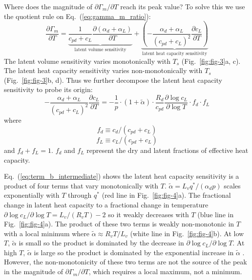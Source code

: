 \documentclass[draft]{ametsocV6.1}
\begin{document}
Where does the magnitude of $\partial\Gamma_m/\partial T$ reach its peak value? To solve this we use the quotient rule on Eq.~(\ref{eq:gamma_m_ratio}):
\begin{equation}
\frac{\partial\Gamma_m}{\partial T} = \underbrace{\frac{1}{c_{pd} + c_L}\frac{\partial(\alpha_d + \alpha_L)}{\partial T}}_{\text{latent volume sensitivity}} + \underbrace{\left(-\frac{\alpha_d + \alpha_L}{(c_{pd} + c_L)^2}\frac{\partial c_L}{\partial T}\right)}_{\text{latent heat capacity sensitivity}} \label{eq:decomposition}
\end{equation}
The latent volume sensitivity varies monotonically with $T_s$ (Fig.~\ref{fig:fig-3}a, c). The latent heat capacity sensitivity varies non-monotonically with $T_s$ (Fig.~\ref{fig:fig-3}b, d). Thus we further decompose the latent heat capacity sensitivity to probe its origin:
\begin{equation}
-\frac{\alpha_d + \alpha_L}{(c_{pd} + c_L)^2}\frac{\partial c_L}{\partial T} = -\frac{1}{p} \cdot \left(1 + \tilde{\alpha}\right) \cdot \frac{R_d}{c_{pd}}\frac{\partial\log{c_L}}{\partial \log{T}} \cdot f_d \cdot f_L \label{eq:term_b_intermediate}
\end{equation}
where
\begin{equation}
f_d \equiv c_{d}/(c_{pd} + c_L) \label{eq:f_d}
\end{equation}
\begin{equation}
f_L \equiv c_{L}/(c_{pd} + c_L) \label{eq:f_L}
\end{equation}
and $f_d + f_L = 1$. $f_d$ and $f_L$ represent the dry and latent fractions of effective heat capacity. 

Eq.~(\ref{eq:term_b_intermediate}) shows the latent heat capacity sensitivity is a product of four terms that vary monotonically with $T$. $\tilde{\alpha}=L_v q^* / (\alpha_d p)$ scales exponentially with $T$ through $q^*$ (red line in Fig.~\ref{fig:fig-4}a). The fractional change in latent heat capacity to a fractional change in temperature $\partial\log{c_L}/\partial\log{T} = L_v / (R_v T) - 2$ so it weakly decreases with $T$ (blue line in Fig.~\ref{fig:fig-4}a). The product of these two terms is weakly non-monotonic in $T$ with a local minimum where $\tilde{\alpha} \approx R_vT/L_v$ (white line in Fig.~\ref{fig:fig-4}b). At low $T$, $\tilde{\alpha}$ is small so the product is dominated by the decrease in $\partial\log{c_L}/\partial\log{T}$. At high $T$, $\tilde{\alpha}$ is large so the product is dominated by the exponential increase in $\tilde{\alpha}$ . However, the non-monotonicity of these two terms are not the source of the peak in the magnitude of $\partial\Gamma_m/\partial T$, which requires a local maximum, not a minimum.
\end{document}
